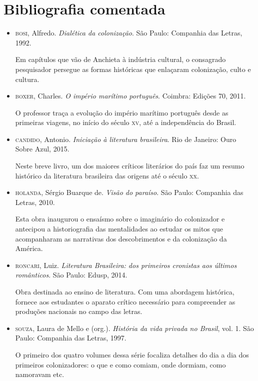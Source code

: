 \documentclass[12pt]{extarticle}
\begin{document}
\section{Bibliografia comentada}

\begin{itemize}
\item\textsc{bosi}, Alfredo. \textit{Dialética da colonização}. São Paulo: Companhia
das Letras, 1992.

Em capítulos que vão de Anchieta à indústria cultural, o consagrado
pesquisador persegue as formas históricas que enlaçaram colonização,
culto e cultura.

\item\textsc{boxer}, Charles. \textit{O império marítimo português}. Coimbra: Edições 70, 2011.

O professor traça a evolução do império marítimo português desde as
primeiras viagens, no início do século \textsc{xv}, até a independência do
Brasil.

\item\textsc{candido}, Antonio. \textit{Iniciação à literatura brasileira}. Rio de
Janeiro: Ouro Sobre Azul, 2015.

Neste breve livro, um dos maiores críticos literários do país faz um
resumo histórico da literatura brasileira das origens até o século \textsc{xx}.

\item\textsc{holanda}, Sérgio Buarque de. \textit{Visão do paraíso}. São Paulo:
Companhia das Letras, 2010.

Esta obra inaugurou o ensaísmo sobre o imaginário do colonizador e
antecipou a historiografia das mentalidades ao estudar os mitos que
acompanharam as narrativas dos descobrimentos e da colonização da
América.

\item\textsc{roncari}, Luiz. \textit{Literatura Brasileira: dos primeiros cronistas
aos últimos românticos}. São Paulo: Edusp, 2014.

Obra destinada ao ensino de literatura. Com uma abordagem histórica,
fornece aos estudantes o aparato crítico necessário para compreender as
produções nacionais no campo das letras.

\item\textsc{souza}, Laura de Mello e (org.). \textit{História da vida privada no
Brasil}, vol. 1. São Paulo: Companhia das Letras, 1997.

O primeiro dos quatro volumes dessa série focaliza detalhes do dia a dia
dos primeiros colonizadores: o que e como comiam, onde dormiam, como
namoravam etc.
\end{itemize}
\end{document}

